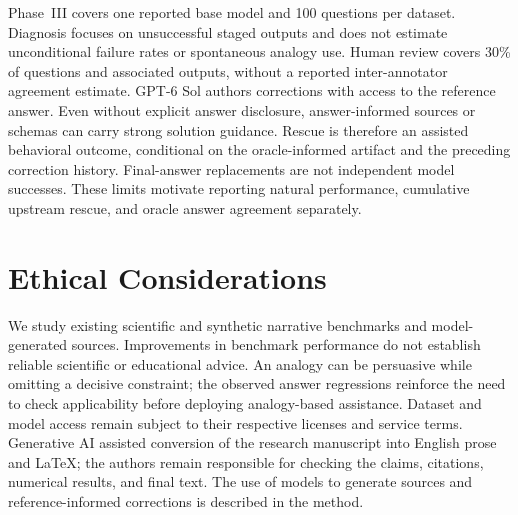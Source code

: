 Phase~III covers one reported base model and 100 questions per dataset. Diagnosis focuses on unsuccessful staged outputs and does not estimate unconditional failure rates or spontaneous analogy use. Human review covers 30\% of questions and associated outputs, without a reported inter-annotator agreement estimate. GPT-6 Sol authors corrections with access to the reference answer. Even without explicit answer disclosure, answer-informed sources or schemas can carry strong solution guidance. Rescue is therefore an assisted behavioral outcome, conditional on the oracle-informed artifact and the preceding correction history. Final-answer replacements are not independent model successes. These limits motivate reporting natural performance, cumulative upstream rescue, and oracle answer agreement separately.

\section*{Ethical Considerations}
We study existing scientific and synthetic narrative benchmarks and model-generated sources. Improvements in benchmark performance do not establish reliable scientific or educational advice. An analogy can be persuasive while omitting a decisive constraint; the observed answer regressions reinforce the need to check applicability before deploying analogy-based assistance. Dataset and model access remain subject to their respective licenses and service terms. Generative AI assisted conversion of the research manuscript into English prose and LaTeX; the authors remain responsible for checking the claims, citations, numerical results, and final text. The use of models to generate sources and reference-informed corrections is described in the method.
